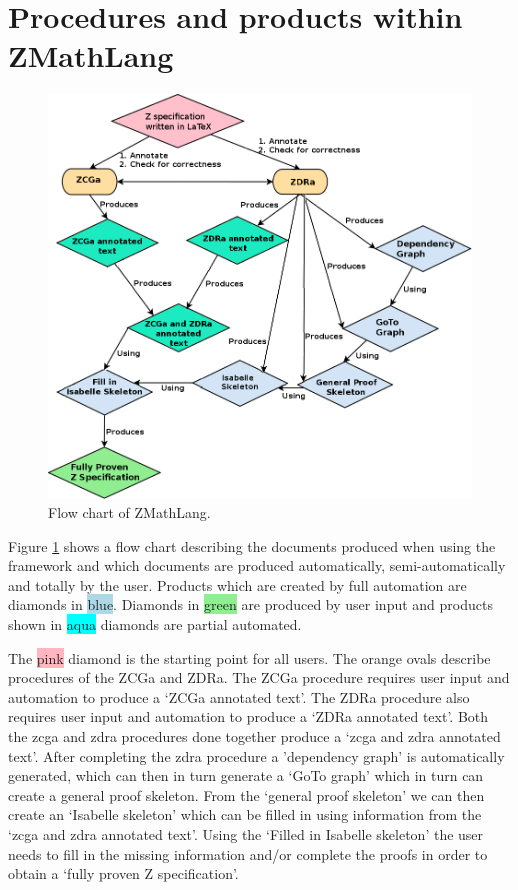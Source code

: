 \section{Procedures and products within ZMathLang}

\begin{figure}[H]
 \begin{center}
 \includegraphics [scale=0.4]{Figures/Design/ZMathLangFlow.png}
 \caption{Flow chart of ZMathLang.}
 \label{fig:zmathflow}
\end{center}
\end{figure} 

Figure \ref{fig:zmathflow} shows a flow chart describing the documents produced
when using the framework and which documents are produced automatically,
semi-automatically and totally by the user. Products which are created by full
automation are diamonds in \colorbox{lightblue}{blue}. Diamonds in
\colorbox{lightgreen}{green} are produced by user input and products shown in
\colorbox{aqua}{aqua} diamonds are partial automated.

The \colorbox{lightpink}{pink} diamond is the starting point for all users. The
\colorbox{lightorange}{orange} ovals describe procedures of the ZCGa and ZDRa.
The ZCGa procedure requires user input and automation to produce a `ZCGa
annotated text'. The ZDRa procedure also requires user input and automation to
produce a `ZDRa annotated text'. Both the \gls{zcga} and \gls{zdra} procedures
done together produce a `\gls{zcga} and \gls{zdra} annotated text'. After
completing the \gls{zdra} procedure a 'dependency graph' is automatically
generated, which can then in turn generate a `GoTo graph' which in turn can
create a general proof skeleton. From the `general proof skeleton' we can then
create an `Isabelle skeleton'  which can be filled in using information from the
`\gls{zcga} and \gls{zdra} annotated text'. Using the `Filled in Isabelle
skeleton' the user needs to fill in the missing information and/or complete the
proofs in order to obtain a `fully proven Z specification'.

